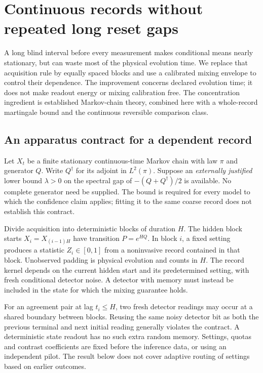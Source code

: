 \chapter{Continuous records without repeated long reset gaps}
\label{ch:ci-dependence}

A long blind interval before every measurement makes conditional means nearly
stationary, but can waste most of the physical evolution time. We replace that
acquisition rule by equally spaced blocks and use a calibrated mixing envelope
to control their dependence. The improvement concerns declared evolution time;
it does not make readout energy or mixing calibration free. The concentration
ingredient is established Markov-chain theory, combined here with a whole-record
martingale bound and the continuous reversible comparison class.

\section{An apparatus contract for a dependent record}
Let $X_t$ be a finite stationary continuous-time Markov chain with law $\pi$ and
generator $Q$. Write $Q^\dagger$ for its adjoint in $L^2(\pi)$. Suppose an
\emph{externally justified} lower bound $\lambda>0$ on the spectral gap of
$-(Q+Q^\dagger)/2$ is available. No complete generator need be supplied.
The bound is required for every model to which the confidence claim applies;
fitting it to the same coarse record does not establish this contract.

Divide acquisition into deterministic blocks of duration $H$. The hidden
block starts $X_i=X_{(i-1)H}$ have transition $P=e^{HQ}$. In block $i$, a fixed
setting produces a statistic $Z_i\in[0,1]$ from a noninvasive record contained
in that block. Unobserved padding is physical evolution and counts in $H$.
The record kernel depends on the current hidden start and its predetermined
setting, with fresh conditional detector noise. A detector with memory must
instead be included in the state for which the mixing guarantee holds.

For an agreement pair at lag $t_i\leq H$, two fresh detector readings may occur
at a shared boundary between blocks. Reusing the same noisy detector bit as
both the previous terminal and next initial reading generally violates the
contract. A deterministic state readout has no such extra random memory.
Settings, quotas and contrast coefficients are fixed before the inference
data, or using an independent pilot. The result below does not cover adaptive
routing of settings based on earlier outcomes.

